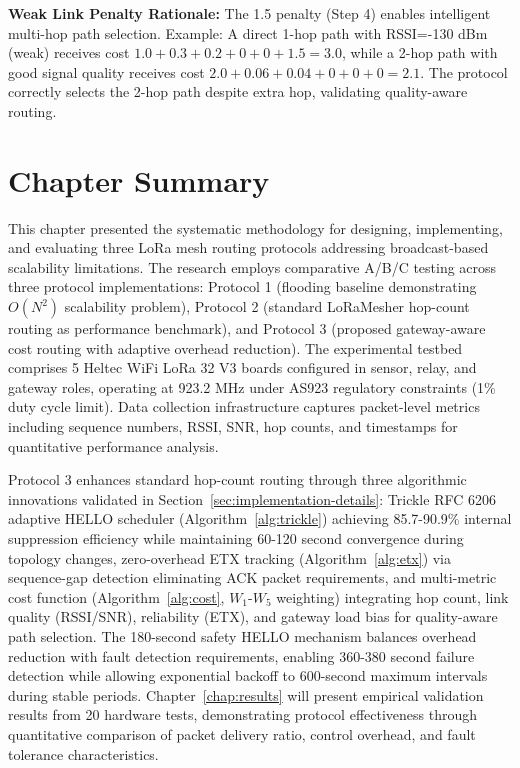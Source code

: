 \textbf{Weak Link Penalty Rationale:} The 1.5 penalty (Step 4) enables intelligent multi-hop path selection. Example: A direct 1-hop path with RSSI=-130 dBm (weak) receives cost $1.0 + 0.3 + 0.2 + 0 + 0 + 1.5 = 3.0$, while a 2-hop path with good signal quality receives cost $2.0 + 0.06 + 0.04 + 0 + 0 + 0 = 2.1$. The protocol correctly selects the 2-hop path despite extra hop, validating quality-aware routing.

\section{Chapter Summary}

This chapter presented the systematic methodology for designing, implementing, and evaluating three LoRa mesh routing protocols addressing broadcast-based scalability limitations. The research employs comparative A/B/C testing across three protocol implementations: Protocol 1 (flooding baseline demonstrating $O(N^2)$ scalability problem), Protocol 2 (standard LoRaMesher hop-count routing as performance benchmark), and Protocol 3 (proposed gateway-aware cost routing with adaptive overhead reduction). The experimental testbed comprises 5 Heltec WiFi LoRa 32 V3 boards configured in sensor, relay, and gateway roles, operating at 923.2 MHz under AS923 regulatory constraints (1\% duty cycle limit). Data collection infrastructure captures packet-level metrics including sequence numbers, RSSI, SNR, hop counts, and timestamps for quantitative performance analysis.

Protocol 3 enhances standard hop-count routing through three algorithmic innovations validated in Section~\ref{sec:implementation-details}: Trickle RFC 6206 adaptive HELLO scheduler (Algorithm~\ref{alg:trickle}) achieving 85.7-90.9\% internal suppression efficiency while maintaining 60-120 second convergence during topology changes, zero-overhead ETX tracking (Algorithm~\ref{alg:etx}) via sequence-gap detection eliminating ACK packet requirements, and multi-metric cost function (Algorithm~\ref{alg:cost}, $W_1$-$W_5$ weighting) integrating hop count, link quality (RSSI/SNR), reliability (ETX), and gateway load bias for quality-aware path selection. The 180-second safety HELLO mechanism balances overhead reduction with fault detection requirements, enabling 360-380 second failure detection while allowing exponential backoff to 600-second maximum intervals during stable periods. Chapter~\ref{chap:results} will present empirical validation results from 20 hardware tests, demonstrating protocol effectiveness through quantitative comparison of packet delivery ratio, control overhead, and fault tolerance characteristics.

